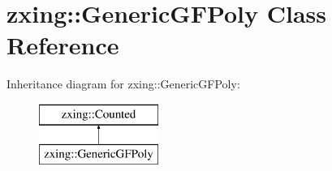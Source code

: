 \hypertarget{classzxing_1_1_generic_g_f_poly}{}\section{zxing\+:\+:Generic\+G\+F\+Poly Class Reference}
\label{classzxing_1_1_generic_g_f_poly}
Inheritance diagram for zxing\+:\+:Generic\+G\+F\+Poly\+:\begin{figure}[H]
\begin{center}
\leavevmode
\includegraphics[height=2.000000cm]{classzxing_1_1_generic_g_f_poly}
\end{center}
\end{figure}

